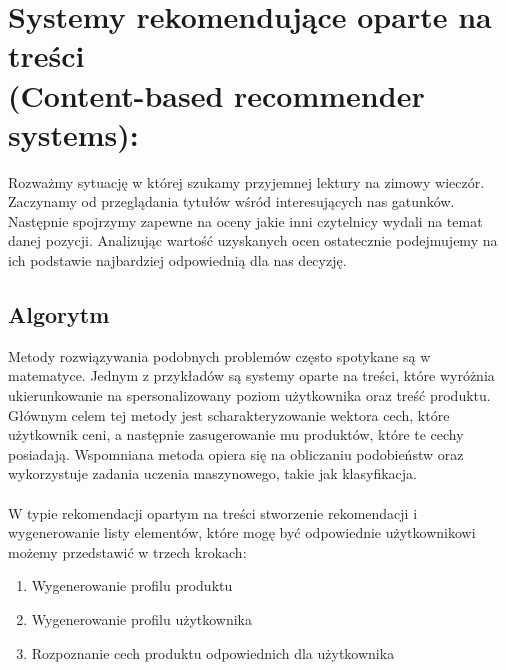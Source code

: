 \documentclass[12pt,a4paper]{report}
\begin{document}
\section{Systemy rekomendujące oparte na treści 
\\(Content-based recommender systems):}
Rozważmy sytuację w której szukamy przyjemnej lektury na zimowy wieczór. Zaczynamy od przeglądania tytułów wśród interesujących nas gatunków. Następnie spojrzymy zapewne na oceny jakie inni czytelnicy wydali na temat danej pozycji. Analizując wartość uzyskanych ocen ostatecznie podejmujemy na ich podstawie najbardziej odpowiednią dla nas decyzję. 



\subsection{Algorytm}
Metody rozwiązywania podobnych problemów często spotykane są w matematyce. Jednym z przykładów są systemy oparte na treści, które wyróżnia ukierunkowanie na spersonalizowany poziom użytkownika oraz treść produktu. Głównym celem tej metody jest scharakteryzowanie wektora cech, które użytkownik ceni, a następnie zasugerowanie mu produktów, które te cechy posiadają. Wspomniana metoda opiera się na obliczaniu podobieństw oraz wykorzystuje zadania uczenia maszynowego, takie jak klasyfikacja.
\\
\\
W typie rekomendacji opartym na treści stworzenie rekomendacji i wygenerowanie listy elementów, które mogę być odpowiednie użytkownikowi możemy przedstawić w trzech krokach:
\begin{enumerate}
\item{Wygenerowanie profilu produktu}
\item{Wygenerowanie profilu użytkownika}
\item{Rozpoznanie cech produktu odpowiednich dla użytkownika}
\end{enumerate}
\end{document}
